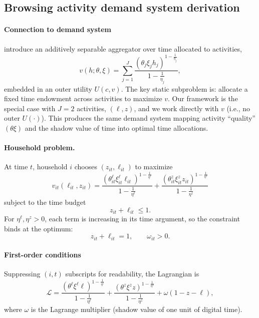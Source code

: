 \documentclass[12pt]{article}
\begin{document}
\subsection{Browsing activity demand system derivation}

\paragraph{Connection to \cite{aguiar2021} demand system}
\cite{aguiar2021} introduce an additively separable aggregator over time allocated to activities,
\[
v(h;\theta,\xi)=\sum_{j=1}^J \frac{\left(\theta_j \xi_j h_j\right)^{1-\frac{1}{\eta_j}}}{1-\frac{1}{\eta_j}},
\]
embedded in an outer utility $U(c,v)$. The key static subproblem is: allocate a fixed time endowment across activities to maximize $v$. Our framework is the special case with $J=2$ activities, $(\ell,z)$, and we work directly with $v$ (i.e., no outer $U(\cdot)$). This produces the same demand system mapping activity ``quality'' $(\theta\xi)$ and the shadow value of time into optimal time allocations.

\paragraph{Household problem.} \label{app:focs}
At time $t$, household $i$ chooses $(z_{it},\ell_{it})$ to maximize
\begin{equation}
\label{eq:app_util}
v_{it}(\ell_{it},z_{it})
= \frac{\left(\theta_{it}^{\ell}\xi_{it}^{\ell}\ell_{it}\right)^{1-\frac{1}{\eta^{\ell}}}}{1-\frac{1}{\eta^{\ell}}}
+ \frac{\left(\theta_{it}^{z}\xi_{it}^{z}z_{it}\right)^{1-\frac{1}{\eta^{z}}}}{1-\frac{1}{\eta^{z}}}
\end{equation}
subject to the time budget
\begin{equation}
\label{eq:app_time}
z_{it}+\ell_{it}\le 1.
\end{equation}
For $\eta^{\ell},\eta^{z}>0$, each term is increasing in its time argument, so the constraint binds at the optimum:
\[
z_{it}+\ell_{it}=1, \qquad \omega_{it}>0.
\]

\paragraph{First-order conditions}
Suppressing $(i,t)$ subscripts for readability, the Lagrangian is
\[
\mathcal{L}
=
\frac{\left(\theta^{\ell}\xi^{\ell}\ell\right)^{1-\frac{1}{\eta^{\ell}}}}{1-\frac{1}{\eta^{\ell}}}
+
\frac{\left(\theta^{z}\xi^{z}z\right)^{1-\frac{1}{\eta^{z}}}}{1-\frac{1}{\eta^{z}}}
+
\omega(1-z-\ell),
\]
where $\omega$ is the Lagrange multiplier (shadow value of one unit of digital time).
\end{document}

